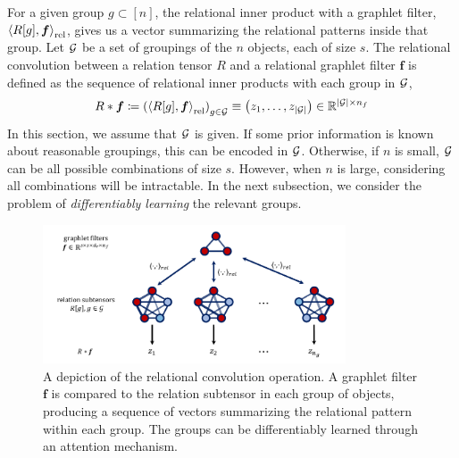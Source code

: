 For a given group $g \subset [n]$, the relational inner product with a graphlet filter, $\left \langle R[g], \bm{f} \right\rangle_\mathrm{rel}$, gives us a vector summarizing the relational patterns inside that group.
Let ${\mathcal{G}}$ be a set of groupings of the $n$ objects, each of size $s$. The relational convolution between a relation tensor $R$ and a relational graphlet filter $\bm{f}$ is defined as the sequence of relational inner products with each group in ${\mathcal{G}}$,
\begin{equation}\label{eq:relational_convolution}
    R \ast \bm{f} \coloneq \left( \left\langle R[g], \boldsymbol{f} \right\rangle_\mathrm{rel} \right)_{g \in {\mathcal{G}}} \equiv \left(z_1, \ldots, z_{\left\lvert{\mathcal{G}}\right\rvert}\right) \in \mathbb{R}^{\left\lvert{\mathcal{G}}\right\rvert \times n_f}
\end{equation}
In this section, we assume that ${\mathcal{G}}$ is given. 
If some prior information is known about reasonable groupings, this can be encoded in ${\mathcal{G}}$. Otherwise, if $n$ is small, ${\mathcal{G}}$ can be all possible combinations of size $s$. However, when $n$ is large, considering all combinations will be intractable. In the next subsection, we consider the problem of \textit{differentiably learning} the relevant groups.


\begin{figure}[t]
    \centering
    \includegraphics[width=0.8\textwidth]{figs/relconv_figs_updated.pdf}
    \vskip-12pt
    \caption{A depiction of the relational convolution operation. A graphlet filter $\bm{f}$ is compared to the relation subtensor in each group of objects, producing a sequence of vectors summarizing the relational pattern within each group. The groups can be differentiably learned through an attention mechanism.
    }\label{fig:relconvdiagram}
    \vskip-12pt
\end{figure}

